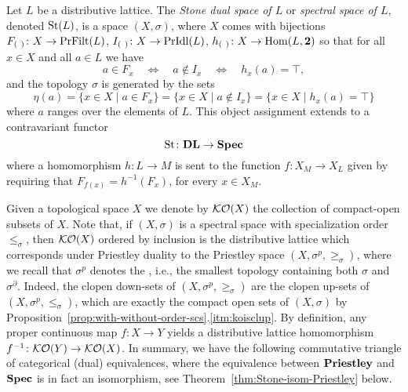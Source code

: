 \begin{definition}\label{def:StoneFunctor}
Let $L$ be a distributive lattice.  The \emph{Stone dual space of $L$} or \emph{spectral space of $L$}, denoted $\mathrm{St}(L)$, is a space $(X,\sigma)$, where $X$ comes with bijections $F_{(\ )}\colon X\to\mathrm{PrFilt}(L)$, $I_{(\ )}\colon X\to\mathrm{PrIdl}(L)$, $h_{(\ )}\colon X\to\mathrm{Hom}(L,{\bf 2})$ so that for all $x\in X$ and all $a\in L$ we have
\[
a\in F_x\quad\iff\quad a\not\in I_x \quad\iff\quad h_x(a)=\top,
\]
and the topology $\sigma$ is generated by the sets
\[
\eta(a)=\{x\in X\mid a\in F_x\}=\{x\in X\mid a\not\in I_x\}=\{x\in X\mid h_x(a)=\top\}
\]
where $a$ ranges over the elements of $L$. This object assignment extends to a contravariant functor
\[
\mathrm{St}\colon\mathbf{DL}\to\mathbf{Spec}
\]
where a homomorphism $h\colon L \to M$ is sent to the function  $f\colon X_M\to X_L$ given by
requiring that $F_{f(x)}=h^{-1}(F_x)$, for every $x \in X_M$.
\end{definition}

Given a topological space $X$ we denote by ${\mathcal{KO}}(X)$ the collection of compact-open subsets of $X$. Note that, if $(X,\sigma)$ is a spectral space with specialization order $\leq_\sigma$, then ${\mathcal{KO}}(X)$ ordered by inclusion is the distributive lattice which corresponds under Priestley duality to the Priestley space $(X,\sigma^p,\geq_\sigma)$, where we recall that $\sigma^p$ denotes the , i.e., the smallest topology containing both $\sigma$ and $\sigma^\partial$. Indeed, the clopen down-sets of $(X,\sigma^p, \geq_\sigma)$ are the clopen up-sets of $(X,\sigma^p, \leq_\sigma)$, which are exactly the compact open sets of $(X,\sigma)$ by Proposition~\ref{prop:with-without-order-scs}.\ref{itm:koisclup}. By definition, any proper continuous map $f \colon X \to Y$ yields a distributive lattice homomorphism $f^{-1} \colon {\mathcal{KO}}(Y) \to {\mathcal{KO}}(X)$. In summary, we have the following commutative triangle of categorical (dual) equivalences, where the equivalence between $\mathbf{Priestley}$ and $\mathbf{Spec}$ is in fact an isomorphism, see Theorem~\ref{thm:Stone-isom-Priestley} below.

